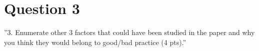\section{Question 3}

''3. Enumerate other 3 factors that could have been studied in the paper and why you think they would
belong to good/bad practice (4 pts).''